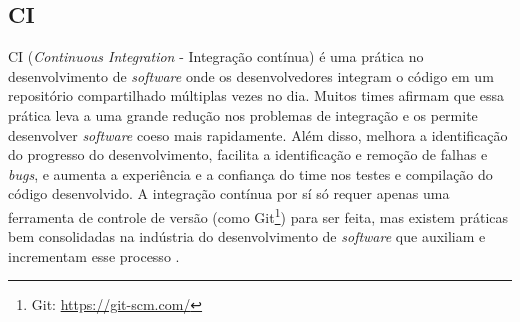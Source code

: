 


\subsection{CI}
CI (\emph{Continuous Integration} - Integração contínua) é uma prática no desenvolvimento de \emph{software} onde os desenvolvedores integram o código em um repositório compartilhado múltiplas vezes no dia. Muitos times afirmam que essa prática leva a uma grande redução nos problemas de integração e os permite desenvolver \emph{software} coeso mais rapidamente. Além disso, melhora a identificação do progresso do desenvolvimento, facilita a identificação e remoção de falhas e \emph{bugs}, e aumenta a experiência e a confiança do time nos testes e compilação do código desenvolvido. A integração contínua por sí só requer apenas uma ferramenta de controle de versão (como Git\footnote{Git: \url{https://git-scm.com/}}) para ser feita, mas existem práticas bem consolidadas na indústria do desenvolvimento de \emph{software} que auxiliam e incrementam esse processo \cite{martin-fowler-continuous-integration}.


